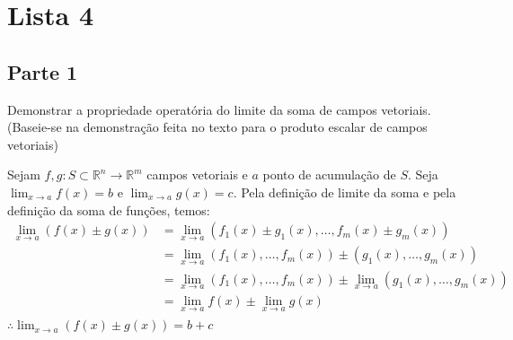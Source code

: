 \documentclass[../main.tex]{subfiles}
\begin{document}
	
	\section{Lista 4}
		\subsection{Parte 1}
		
		\begin{exercicio}{3}
			Demonstrar a propriedade operatória do limite da soma de campos vetoriais. (Baseie-se na demonstração feita no texto para o produto escalar de campos vetoriais)
		\end{exercicio}
		\begin{solucao}
			Sejam $f,g\colon S\subset \mathbb{R}^n \rightarrow \mathbb{R}^m$ campos vetoriais e $a$ ponto de acumulação de $S$. Seja $\lim_{x \to a} f(x)=b$ e $\lim_{x \to a} g(x)=c$. Pela definição de limite da soma e pela definição da soma de funções, temos:
			\begin{align*}
				\lim_{x \to a} (f(x) \pm g(x))
					&= \lim_{x \to a} (f_1(x)\pm g_1(x),\dots, f_m(x)\pm g_m(x)) \\
					&= \lim_{x \to a} (f_1(x),\dots,f_m(x))\pm (g_1(x),\dots, g_m(x))\\
					&= \lim_{x \to a} (f_1(x),\dots,f_m(x))\pm \lim_{x \to a} (g_1(x),\dots, g_m(x)) \\
					&= \lim_{x \to a} f(x) \pm \lim_{x\to a} g(x) \\
			\end{align*}
			$\therefore \lim_{x \to a} (f(x) \pm g(x)) = b+c$
		\end{solucao}
		
\end{document}
